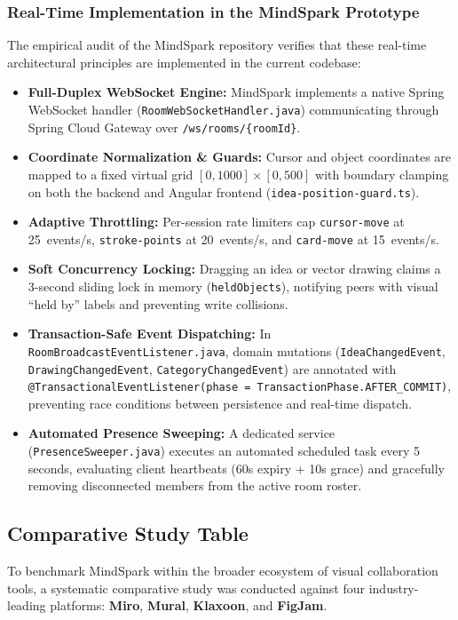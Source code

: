 \subsubsection{Real-Time Implementation in the MindSpark Prototype}
The empirical audit of the MindSpark repository verifies that these real-time architectural principles are implemented in the current codebase:
\begin{itemize}
    \item \textbf{Full-Duplex WebSocket Engine:} MindSpark implements a native Spring WebSocket handler (\texttt{RoomWebSocketHandler.java}) communicating through Spring Cloud Gateway over \texttt{/ws/rooms/\{roomId\}}.
    \item \textbf{Coordinate Normalization \& Guards:} Cursor and object coordinates are mapped to a fixed virtual grid $[0, 1000] \times [0, 500]$ with boundary clamping on both the backend and Angular frontend (\texttt{idea-position-guard.ts}).
    \item \textbf{Adaptive Throttling:} Per-session rate limiters cap \texttt{cursor-move} at 25~events/s, \texttt{stroke-points} at 20~events/s, and \texttt{card-move} at 15~events/s.
    \item \textbf{Soft Concurrency Locking:} Dragging an idea or vector drawing claims a 3-second sliding lock in memory (\texttt{heldObjects}), notifying peers with visual ``held by'' labels and preventing write collisions.
    \item \textbf{Transaction-Safe Event Dispatching:} In \texttt{RoomBroadcastEventListener.java}, domain mutations (\texttt{IdeaChangedEvent}, \texttt{DrawingChangedEvent}, \texttt{CategoryChangedEvent}) are annotated with \texttt{@TransactionalEventListener(\allowbreak phase = TransactionPhase.\allowbreak AFTER\_COMMIT)}, preventing race conditions between persistence and real-time dispatch.
    \item \textbf{Automated Presence Sweeping:} A dedicated service (\texttt{PresenceSweeper.java}) executes an automated scheduled task every 5 seconds, evaluating client heartbeats (60s expiry + 10s grace) and gracefully removing disconnected members from the active room roster.
\end{itemize}


\subsection{Comparative Study Table}
\label{subsec:comparative_study}

To benchmark MindSpark within the broader ecosystem of visual collaboration tools, a systematic comparative study was conducted against four industry-leading platforms: \textbf{Miro}, \textbf{Mural}, \textbf{Klaxoon}, and \textbf{FigJam}. 

